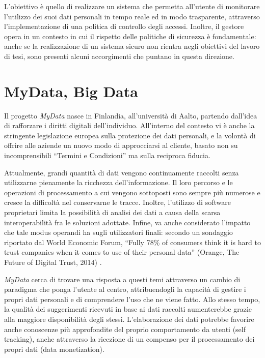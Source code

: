 L’obiettivo \`e quello di realizzare un sistema che permetta all’utente di monitorare l’utilizzo dei suoi dati personali in tempo reale ed in modo trasparente, attraverso l’implementazione di una politica di controllo degli accessi. Inoltre, il gestore opera in un contesto in cui il rispetto delle politiche di sicurezza \`e fondamentale: anche se la realizzazione di un sistema sicuro non rientra negli obiettivi del lavoro di tesi, sono presenti alcuni accorgimenti che puntano in questa direzione.

\section{MyData, Big Data}
Il progetto \textit{MyData} nasce in Finlandia, all’universit\`a di Aalto, partendo dall’idea di rafforzare i diritti digitali dell’individuo. All’interno del contesto vi \`e anche la stringente legislazione europea sulla protezione dei dati personali, e la volont\`a di offrire alle aziende un nuovo modo di approcciarsi al cliente, basato non su incomprensibili “Termini e Condizioni” ma sulla reciproca fiducia.

Attualmente, grandi quantit\`a di dati vengono continuamente raccolti senza utilizzarne pienamente la ricchezza dell’informazione. Il loro percorso e le operazioni di processamento a cui vengono sottoposti sono sempre pi\`u numerose e cresce la difficolt\`a nel conservarne le tracce. Inoltre, l’utilizzo di software proprietari limita la possibilit\`a di analisi dei dati a causa della scarsa interoperabilit\`a fra le soluzioni adottate. Infine, va anche considerato l’impatto che tale modus operandi ha sugli utilizzatori finali: secondo un sondaggio riportato dal World Economic Forum, “Fully 78\% of consumers think it is hard to trust companies when it comes to use of their personal data” (Orange, The Future of Digital Trust, 2014) \cite{wefreport}.

\textit{MyData} cerca di trovare una risposta a questi temi attraverso un cambio di paradigma che ponga l’utente al centro, attribuendogli la capacit\`a di gestire i propri dati personali e di comprendere l’uso che ne viene fatto. Allo stesso tempo, la qualit\`a dei suggerimenti ricevuti in base ai dati raccolti aumenterebbe grazie alla maggiore disponibilit\`a degli stessi. L’elaborazione dei dati potrebbe favorire anche conoscenze pi\`u approfondite del proprio comportamento da utenti (self tracking), anche attraverso la ricezione di un compenso per il processamento dei propri dati (data monetization)\cite{mydatawhitepaper}.

